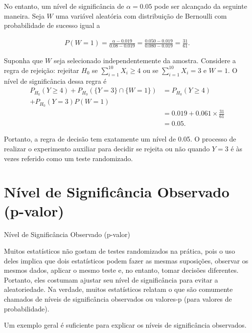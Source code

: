 \documentclass[12pt]{beamer}
\begin{document}
\begin{frame}{}
\begin{block}{}
\justifying
No entanto, um nível de significância de $\alpha = 0.05$ pode ser alcançado da seguinte maneira. Seja $W$ uma variável aleatória com distribuição de Bernoulli com probabilidade de sucesso igual a

\begin{align*}
P(W = 1) = \frac{\alpha-0.019}{0.08-0.019}=\frac{0.050 - 0.019}{0.080 - 0.019} = \frac{31}{61}.
\end{align*}

Suponha que $W$ seja selecionado independentemente da amostra. Considere a regra de rejeição: rejeitar $H_0$ se $\sum_{i=1}^{10} X_i \geq 4$ ou se $\sum_{i=1}^{10} X_i = 3$ e $W = 1$. O nível de significância dessa regra é
{\small 
\begin{align*}
P_{H_0}(Y \geq 4) + P_{H_0}(\{Y = 3\} \cap \{W = 1\})&= P_{H_0}(Y \geq 4)\\ + P_{H_0}(Y = 3)P(W = 1)\\ &= 0.019 + 0.061 \times \frac{31}{61}\\ &= 0.05.
\end{align*}}
\end{block}
\end{frame}

\begin{frame}{}
\begin{block}{}
\justifying
Portanto, a regra de decisão tem exatamente um nível de 0.05. O processo de realizar o experimento auxiliar para decidir se rejeita ou não quando $Y = 3$ é às vezes referido como um teste randomizado.
\end{block}
\end{frame}

\section{Nível de Significância Observado (p-valor)}
\begin{frame}{Nível de Significância Observado (p-valor)}
\begin{block}{}
\justifying
Muitos estatísticos não gostam de testes randomizados na prática, pois o uso deles implica que dois estatísticos podem fazer as mesmas suposições, observar os mesmos dados, aplicar o mesmo teste e, no entanto, tomar decisões diferentes. Portanto, eles costumam ajustar seu nível de significância para evitar a aleatoriedade. Na verdade, muitos estatísticos relatam o que são comumente chamados de níveis de significância observados ou valores-p (para valores de probabilidade).

Um exemplo geral é suficiente para explicar os níveis de significância observados.  
\end{block}
\end{frame}
\end{document}
